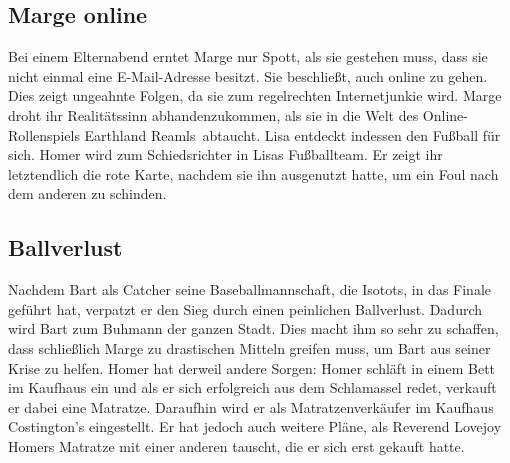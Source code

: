 

\subsection{Marge online}\label{JABF10}
Bei einem Elternabend erntet Marge nur Spott, als sie gestehen muss, dass sie nicht einmal eine E-Mail-Adresse besitzt. Sie beschließt, auch online zu gehen. Dies zeigt ungeahnte Folgen, da sie zum regelrechten Internetjunkie wird. Marge droht ihr Realitätssinn abhandenzukommen, als sie in die Welt des Online-Rollenspiels \glqq Earthland Reamls\grqq\ abtaucht. Lisa entdeckt indessen den Fußball für sich. Homer wird zum Schiedsrichter in Lisas Fußballteam. Er zeigt ihr letztendlich die rote Karte, nachdem sie ihn ausgenutzt hatte, um ein Foul nach dem anderen zu schinden.



\subsection{Ballverlust}\label{JABF11}
Nachdem Bart als Catcher seine Baseballmannschaft, die Isotots, in das Finale geführt hat, verpatzt er den Sieg durch einen peinlichen Ballverlust. Dadurch wird Bart zum Buhmann der ganzen Stadt. Dies macht ihm so sehr zu schaffen, dass schließlich Marge zu drastischen Mitteln greifen muss, um Bart aus seiner Krise zu helfen. Homer hat derweil andere Sorgen: Homer schläft in einem Bett im Kaufhaus ein und als er sich erfolgreich aus dem Schlamassel redet, verkauft er dabei eine Matratze. Daraufhin wird er als Matratzenverkäufer im Kaufhaus Costington's eingestellt. Er hat jedoch auch weitere Pläne, als Reverend Lovejoy Homers Matratze mit einer anderen tauscht, die er sich erst gekauft hatte.

